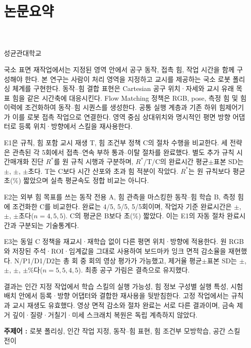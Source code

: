 \chapter*{논문요약}
\begin{center}
{\fontsize{16}{24}\selectfont\bfseries\thesistitlekr\par}
\end{center}
\vspace{.2cm}
\begin{flushright}\begin{singlespace}
\thesisauthorkr\\
\thesisdepartmentkr\\
성균관대학교
\end{singlespace}\end{flushright}
\vspace{.2cm}

국소 표면 재작업에서는 지정된 영역 안에서 공구 동작, 접촉 힘, 작업 시간을 함께 구성해야 한다. 본 연구는 사람이 처리 영역을 지정하고 교시를 제공하는 국소 로봇 폴리싱 체계를 구현한다. 동작--힘 결합 표현은 Cartesian 공구 위치·자세와 교시 유래 목표 힘을 같은 시간축에 대응시킨다. Flow Matching 정책은 RGB, pose, 측정 힘 및 힘 이력에 조건화하여 동작--힘 시퀀스를 생성한다. 공통 실행 계층과 기존 하위 힘제어기가 이를 로봇 접촉 작업으로 연결한다. 영역 중심 상대위치와 명시적인 평면 방향 어댑터로 등록 위치·방향에서 스킬을 재사용한다.

E1은 규칙, 힘 포함 교시 재생 T, 힘 조건부 정책 C의 절차 수행을 비교한다. 세 전략은 관측된 각 5회에서 접촉--연속 부하 통과--이탈 절차를 완료했다. 별도 추가 규칙 시간매개화 진단 \(R^{*}\)를 원 규칙 시행과 구분하며, \(R^{*}\)/T/C의 완료시간 평균\(\pm\)표본 SD는 \EoneRstarTime\(\pm\)\EoneRstarTimeSD, \EoneTTime\(\pm\)\EoneTTimeSD, \EoneCTime\(\pm\)\EoneCTimeSD{}초다. T는 C보다 시간 산포와 초과 힘 적분이 작았다. \(R^{*}\)는 원 규칙보다 평균 \RstarTimeGain{}초(\RstarTimePercent\%) 짧았으며 실측 평균속도 정합 비교는 아니다.

E2는 외부 힘 목표를 쓰는 동작 전용 A, 힘 관측을 마스킹한 동작--힘 학습 B, 측정 힘에 조건화한 C를 비교한다. 완료는 4/5, 5/5, 5/5회이며, 작업자 기준 완료시간은 \EtwoATime\(\pm\)\EtwoATimeSD, \EtwoBTime\(\pm\)\EtwoBTimeSD, \EtwoCTime\(\pm\)\EtwoCTimeSD{}초다(\(n=4,5,5\)). C의 평균은 B보다 \BCSeconds{}초(\BCPercent\%) 짧았다. 이는 E1의 자동 절차 완료시간과 구분되는 기술통계다.

E3는 동일 C 정책을 재교시·재학습 없이 다른 평면 위치·방향에 적용한다. 원 RGB와 저장된 주석·ROI·임계값을 그대로 사용하여 보드마카 잉크 면적 감소율을 재현했다. N/P1/D1/D2는 총 \EthreeMainN{}회 중 \EthreeImageN{}회의 영상 평가가 가능했고, 제거율 평균\(\pm\)표본 SD는 \EthreeNRemoval\(\pm\)\EthreeNSD, \EthreePoneRemoval\(\pm\)\EthreePoneSD, \EthreeDoneRemoval\(\pm\)\EthreeDoneSD, \EthreeDtwoRemoval\(\pm\)\EthreeDtwoSD\%다(\(n=5,5,4,5\)). 최종 공구 가림은 결측으로 유지했다.

결과는 인간 지정 작업에서 학습 스킬의 실행 가능성, 힘 정보 구성별 실행 특성, 시험 배치 안에서 등록·방향 어댑터와 결합한 재사용을 뒷받침한다. 고정 작업에서는 규칙과 교시 재생도 유효했다. 영상 면적 감소와 절차 완료는 서로 다른 결과이며, 금속 제거 깊이·질량·거칠기·미세 스크래치 복원은 독립 계측하지 않았다.

\vspace{.3cm}
\noindent\textbf{주제어 :} 로봇 폴리싱, 인간 작업 지정, 동작--힘 표현, 힘 조건부 모방학습, 공간 스킬 전이
